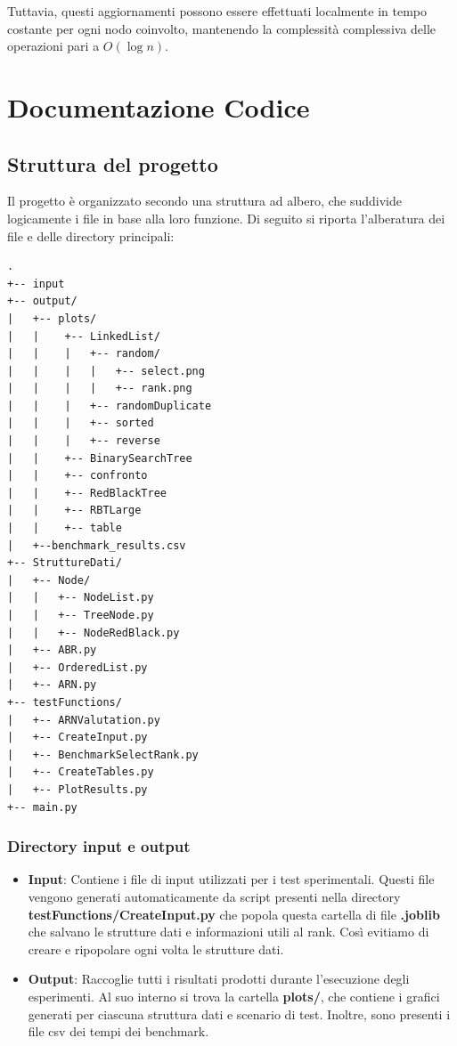 \documentclass[10pt]{article}
\begin{document}
\noindent Tuttavia, questi aggiornamenti possono essere effettuati localmente in tempo costante per ogni nodo coinvolto, mantenendo la complessità complessiva delle operazioni pari a $O(\log n)$.


\section{Documentazione Codice}
\subsection{Struttura del progetto}

Il progetto è organizzato secondo una struttura ad albero, che suddivide logicamente i file in base alla loro funzione. Di seguito si riporta l’alberatura dei file e delle directory principali:
\begin{lstlisting}[basicstyle=\ttfamily\small, frame=none]
.
+-- input
+-- output/
|   +-- plots/
|   |    +-- LinkedList/
|   |    |   +-- random/
|   |    |   |   +-- select.png
|   |    |   |   +-- rank.png
|   |    |   +-- randomDuplicate
|   |    |   +-- sorted
|   |    |   +-- reverse
|   |    +-- BinarySearchTree
|   |    +-- confronto
|   |    +-- RedBlackTree
|   |    +-- RBTLarge
|   |    +-- table
|   +--benchmark_results.csv 
+-- StruttureDati/
|   +-- Node/
|   |   +-- NodeList.py
|   |   +-- TreeNode.py
|   |   +-- NodeRedBlack.py
|   +-- ABR.py
|   +-- OrderedList.py
|   +-- ARN.py  
+-- testFunctions/
|   +-- ARNValutation.py
|   +-- CreateInput.py
|   +-- BenchmarkSelectRank.py
|   +-- CreateTables.py 
|   +-- PlotResults.py
+-- main.py
\end{lstlisting}
\subsubsection{Directory input e output}
\begin{itemize}
    \item \textbf{Input}: Contiene i file di input utilizzati per i test sperimentali. Questi file vengono generati automaticamente da script presenti nella directory \textbf{testFunctions/CreateInput.py} che popola questa cartella di file \textbf{.joblib} che salvano le strutture dati e informazioni utili al rank. Così evitiamo di creare e ripopolare ogni volta le strutture dati.
    \item \textbf{Output}: Raccoglie tutti i risultati prodotti durante l’esecuzione degli esperimenti. Al suo interno si trova la cartella \textbf{plots/}, che contiene i grafici generati per ciascuna struttura dati e scenario di test. Inoltre, sono presenti i file csv dei tempi dei benchmark.
\end{itemize}
\end{document}
